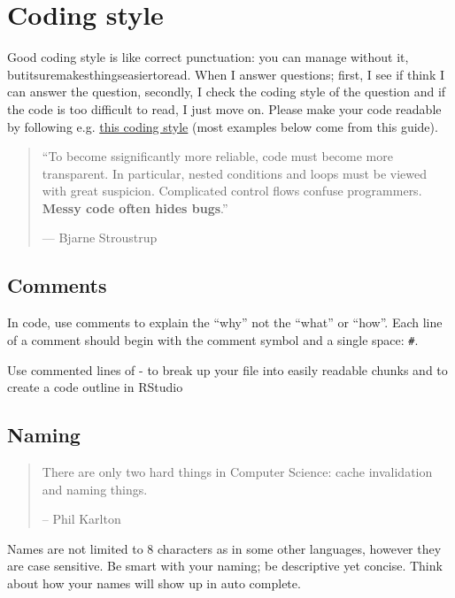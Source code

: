 \documentclass[]{book}
\theoremstyle{definition}
\theoremstyle{definition}
\theoremstyle{definition}
\theoremstyle{remark}
\let\BeginKnitrBlock\begin \let\EndKnitrBlock\end
\begin{document}
\section{Coding style}\label{coding-style}

Good coding style is like correct punctuation: you can manage without
it, butitsuremakesthingseasiertoread. When I answer questions; first, I
see if think I can answer the question, secondly, I check the coding
style of the question and if the code is too difficult to read, I just
move on. Please make your code readable by following e.g.
\href{http://style.tidyverse.org/}{this coding style} (most examples
below come from this guide).

\begin{quote}
``To become ssignificantly more reliable, code must become more
transparent. In particular, nested conditions and loops must be viewed
with great suspicion. Complicated control flows confuse programmers.
\textbf{Messy code often hides bugs}.''

--- Bjarne Stroustrup
\end{quote}

\subsection{Comments}\label{comments}

In code, use comments to explain the ``why'' not the ``what'' or
``how''. Each line of a comment should begin with the comment symbol and
a single space: \texttt{\#}.

\BeginKnitrBlock{rmdtip}
Use commented lines of - to break up your file into easily readable
chunks and to create a code outline in RStudio
\EndKnitrBlock{rmdtip}

\subsection{Naming}\label{naming}

\begin{quote}
There are only two hard things in Computer Science: cache invalidation
and naming things.

-- Phil Karlton
\end{quote}

Names are not limited to 8 characters as in some other languages,
however they are case sensitive. Be smart with your naming; be
descriptive yet concise. Think about how your names will show up in auto
complete.
\end{document}
